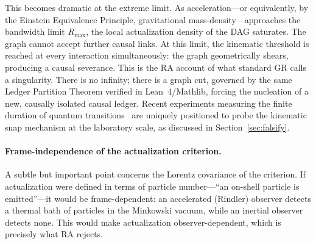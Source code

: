 \documentclass[11pt,a4paper]{article}
\theoremstyle{plain}
\theoremstyle{definition}
\theoremstyle{remark}
\begin{document}
This becomes dramatic at the extreme limit. As acceleration---or equivalently,
by the Einstein Equivalence Principle, gravitational mass-density---approaches
the bandwidth limit $R_{\mathrm{max}}$, the local actualization density of the
DAG saturates. The graph cannot accept further causal links. At this limit, the
kinematic threshold is reached at every interaction simultaneously: the graph
geometrically shears, producing a causal severance. This is the RA account of
what standard GR calls a singularity. There is no infinity; there is a graph cut,
governed by the same Ledger Partition Theorem verified in Lean~4/Mathlib, forcing
the nucleation of a new, causally isolated causal ledger. Recent experiments
measuring the finite duration of quantum transitions~\citep{Minev2019} are
uniquely positioned to probe the kinematic snap mechanism at the laboratory scale,
as discussed in Section~\ref{sec:falsify}.

\paragraph{Frame-independence of the actualization criterion.}
A subtle but important point concerns the Lorentz covariance of the criterion.
If actualization were defined in terms of particle number---``an on-shell particle
is emitted''---it would be frame-dependent: an accelerated (Rindler) observer
detects a thermal bath of particles in the Minkowski vacuum, while an inertial
observer detects none. This would make actualization observer-dependent, which
is precisely what RA rejects.
\end{document}
